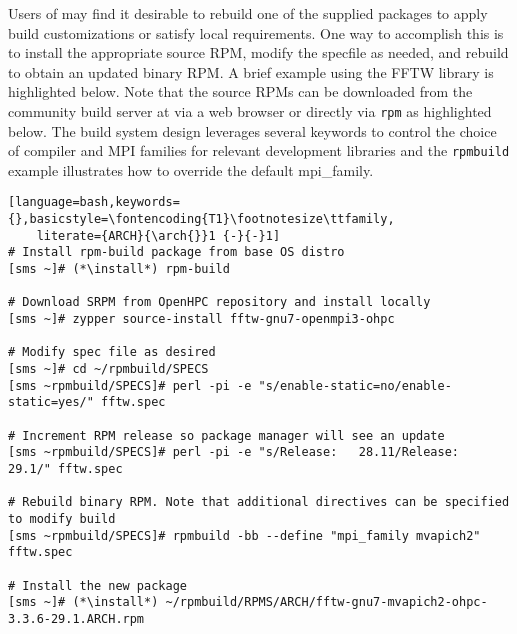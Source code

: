 Users of \OHPC{} may find it desirable to rebuild one of the supplied packages
to apply build customizations or satisfy local requirements. One way to
accomplish this is to install the appropriate source RPM, modify the specfile
as needed, and rebuild to obtain an updated binary RPM. A brief example using
the FFTW library is highlighted below.  Note that the source RPMs can be downloaded from the
community build server at \href{https://build.openhpc.community}
{\color{blue}{https://build.openhpc.community}} via a web browser or directly
via \texttt{rpm} as highlighted below. The \OHPC{} build system design
leverages several keywords to control the choice of compiler and MPI families
for relevant development libraries and the \texttt{rpmbuild} example
illustrates how to override the default mpi\_family.

\begin{lstlisting}[language=bash,keywords={},basicstyle=\fontencoding{T1}\footnotesize\ttfamily,
    literate={ARCH}{\arch{}}1 {-}{-}1]
# Install rpm-build package from base OS distro
[sms ~]# (*\install*) rpm-build

# Download SRPM from OpenHPC repository and install locally
[sms ~]# zypper source-install fftw-gnu7-openmpi3-ohpc

# Modify spec file as desired
[sms ~]# cd ~/rpmbuild/SPECS
[sms ~rpmbuild/SPECS]# perl -pi -e "s/enable-static=no/enable-static=yes/" fftw.spec

# Increment RPM release so package manager will see an update
[sms ~rpmbuild/SPECS]# perl -pi -e "s/Release:   28.11/Release:   29.1/" fftw.spec

# Rebuild binary RPM. Note that additional directives can be specified to modify build
[sms ~rpmbuild/SPECS]# rpmbuild -bb --define "mpi_family mvapich2" fftw.spec

# Install the new package
[sms ~]# (*\install*) ~/rpmbuild/RPMS/ARCH/fftw-gnu7-mvapich2-ohpc-3.3.6-29.1.ARCH.rpm
\end{lstlisting}
